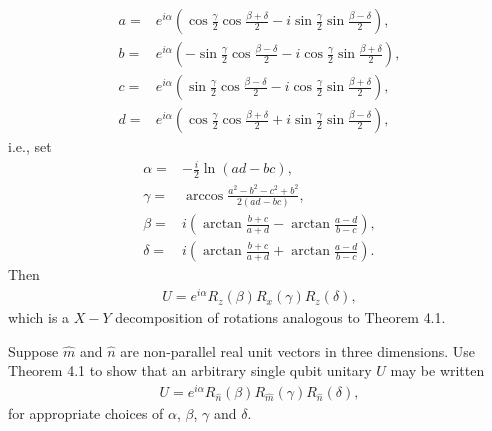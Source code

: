 \documentclass[en]{sol-man}
\begin{document}
\begin{sol}
    \begin{align}
        a=&e^{i\alpha}\left(\cos\frac{\gamma}{2}\cos\frac{\beta+\delta}{2}-i\sin\frac{\gamma}{2}\sin\frac{\beta-\delta}{2}\right),\\
        b=&e^{i\alpha}\left(-\sin\frac{\gamma}{2}\cos\frac{\beta-\delta}{2}-i\cos\frac{\gamma}{2}\sin\frac{\beta+\delta}{2}\right),\\
        c=&e^{i\alpha}\left(\sin\frac{\gamma}{2}\cos\frac{\beta-\delta}{2}-i\cos\frac{\gamma}{2}\sin\frac{\beta+\delta}{2}\right),\\
        d=&e^{i\alpha}\left(\cos\frac{\gamma}{2}\cos\frac{\beta+\delta}{2}+i\sin\frac{\gamma}{2}\sin\frac{\beta-\delta}{2}\right),
    \end{align}
    i.e., set
    \begin{align}
        \alpha=&-\frac{i}{2}\ln(ad-bc),\\
        \gamma=&\arccos\frac{a^2-b^2-c^2+b^2}{2(ad-bc)},\\
        \beta=&i\left(\arctan\frac{b+c}{a+d}-\arctan\frac{a-d}{b-c}\right),\\
        \delta=&i\left(\arctan\frac{b+c}{a+d}+\arctan\frac{a-d}{b-c}\right).
    \end{align}
    Then
    \begin{align}
        U=e^{i\alpha}R_z(\beta)R_x(\gamma)R_z(\delta),
    \end{align}
    which is a $X-Y$ decomposition of rotations analogous to Theorem 4.1.
\end{sol}

\begin{exe}
    Suppose $\hat{m}$ and $\hat{n}$ are non-parallel real unit vectors in three dimensions. Use Theorem 4.1 to show that an arbitrary single qubit unitary $U$ may be written
    \begin{align}
        U=e^{i\alpha}R_{\hat{n}}(\beta)R_{\hat{m}}(\gamma)R_{\hat{n}}(\delta),
    \end{align}
    for appropriate choices of $\alpha$, $\beta$, $\gamma$ and $\delta$.
\end{exe}
\begin{pf}
    
\end{pf}

\ifx\allfiles\undefined
\end{document}
